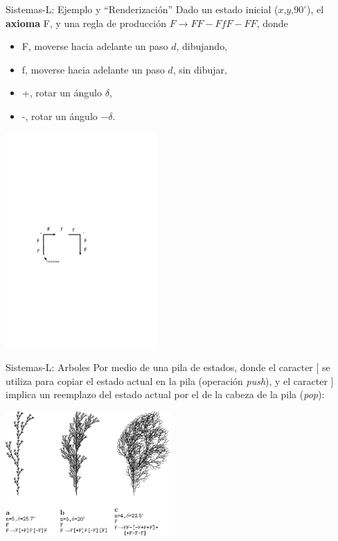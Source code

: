 \documentclass[spanish]{beamer}
\begin{document}
\begin{frame}{Sistemas-L: Ejemplo y ``Renderización''}
Dado un estado inicial ($x$,$y$,$90^{\circ}$), el \textbf{axioma} F, y una regla de producción $F \rightarrow FF-FfF-FF$, donde

\begin{itemize}
\item F, moverse hacia adelante un paso $d$, dibujando,
\item f, moverse hacia adelante un paso $d$, sin dibujar,
\item +, rotar un ángulo $\delta$,
\item -, rotar un ángulo $-\delta$.
\end{itemize}

\center
\includegraphics[width=5.8cm]{../figures/tortuga}

\end{frame}

\begin{frame}{Sistemas-L: Arboles}
Por medio de una pila de estados, donde el caracter $[$ se utiliza para copiar el estado actual en la pila (operación {\em push}), y el caracter $]$ implica un reemplazo del estado actual por el de la cabeza de la pila ({\em pop}):


\center
\includegraphics[width=6.3cm]{../figures/sistemalcorchete}

\end{frame}
\end{document}
